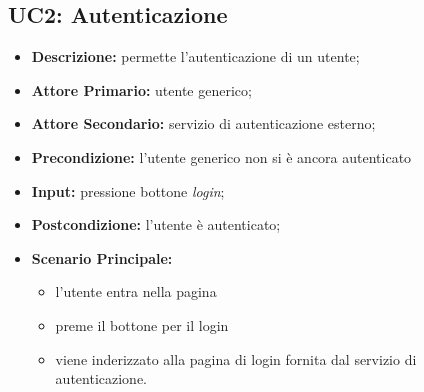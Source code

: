 \subsection{UC2: Autenticazione}
\label{sec:UC2}
\begin{itemize}
    \item \textbf{Descrizione:} permette l'autenticazione di un utente;
    \item \textbf{Attore Primario:} utente generico;
    \item \textbf{Attore Secondario:} servizio di autenticazione esterno;
    \item \textbf{Precondizione:} l'utente generico non si è ancora autenticato
    \item \textbf{Input:} pressione bottone \textit{login};
    \item \textbf{Postcondizione:} l'utente è autenticato;
    \item \textbf{Scenario Principale:}
          \begin{itemize}
              \item l'utente entra nella pagina
              \item preme il bottone per il login
              \item viene inderizzato alla pagina di login fornita dal servizio di autenticazione.
          \end{itemize}
\end{itemize}